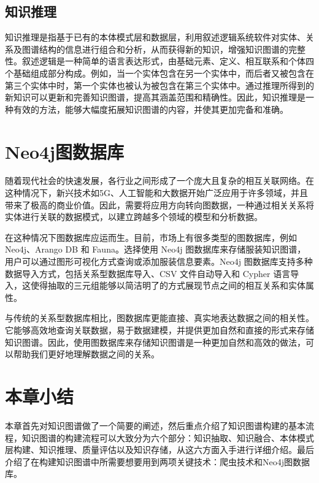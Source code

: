 \documentclass[bachelor_p]{hdu-thesis}
\begin{document}
\subsection{知识推理}
知识推理是指基于已有的本体模式层和数据层，利用叙述逻辑系统软件对实体、关系及图谱结构的信息进行组合和分析，从而获得新的知识，增强知识图谱的完整性。叙述逻辑是一种简单的语言表达形式，由基础元素、定义、相互联系和个体四个基础组成部分构成。例如，当一个实体包含在另一个实体中，而后者又被包含在第三个实体中时，第一个实体也被认为被包含在第三个实体中。通过推理所得到的新知识可以更新和完善知识图谱，提高其涵盖范围和精确性。因此，知识推理是一种有效的方法，能够大幅度拓展知识图谱的内容，并使其更加完备和准确。

\section{Neo4j图数据库}
随着现代社会的快速发展，各行业之间形成了一个庞大且复杂的相互关联网络。在这种情况下，新兴技术如5G、人工智能和大数据开始广泛应用于许多领域，并且带来了极高的商业价值。因此，需要将应用方向转向图数据，一种通过相关关系将实体进行关联的数据模式，以建立跨越多个领域的模型和分析数据。

在这种情况下图数据库应运而生。目前，市场上有很多类型的图数据库，例如 Neo4j、Arango DB 和 Fauna。选择使用 Neo4j 图数据库来存储服装知识图谱，用户可以通过图形可视化方式查询或添加服装信息要素。Neo4j 图数据库支持多种数据导入方式，包括关系型数据库导入、CSV 文件自动导入和 Cypher 语言导入，这使得抽取的三元组能够以简洁明了的方式展现节点之间的相互关系和实体属性。

与传统的关系型数据库相比，图数据库更能直接、真实地表达数据之间的相关性。它能够高效地查询关联数据，易于数据建模，并提供更加自然和直接的形式来存储知识图谱。因此，使用图数据库来存储知识图谱是一种更加自然和高效的做法，可以帮助我们更好地理解数据之间的关系。



\section{本章小结}

本章首先对知识图谱做了一个简要的阐述，然后重点介绍了知识图谱构建的基本流程，知识图谱的构建流程可以大致分为六个部分：知识抽取、知识融合、本体模式层构建、知识推理、质量评估以及知识存储，从这六方面入手进行详细介绍。最后介绍了在构建知识图谱中所需要想要用到两项关键技术：爬虫技术和Neo4j图数据库。
\end{document}
